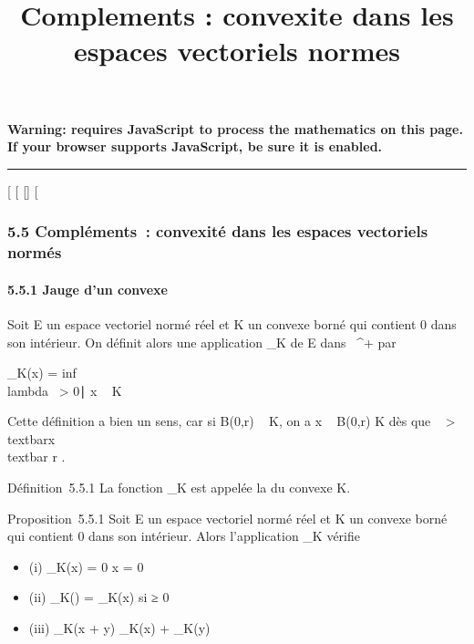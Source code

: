 \documentclass[]{article}
\title{Complements : convexite dans les espaces vectoriels normes}
\author{}
\date{}
\begin{document}
\maketitle

\textbf{Warning: 
requires JavaScript to process the mathematics on this page.\\ If your
browser supports JavaScript, be sure it is enabled.}

\begin{center}\rule{3in}{0.4pt}\end{center}

{[}
{[}
{[}{]}
{[}

\subsubsection{5.5 Compléments~: convexité dans les espaces vectoriels
normés}

\paragraph{5.5.1 Jauge d'un convexe}

Soit E un espace vectoriel normé réel et K un convexe borné qui contient
0 dans son intérieur. On définit alors une application \jmath\_K de E
dans ~^+ par

\jmath\_K(x) = inf~ \\lambda~
\textgreater{} 0∣ x \over
\lambda~ \in K\

Cette définition a bien un sens, car si B(0,r) \subset~ K, on a  x
\over \lambda~ \in B(0,r) \in K dès que \lambda~ \textgreater{}
\\textbar{}x\\textbar{}
\over r .

Définition~5.5.1 La fonction \jmath\_K est appelée la \jmathauge du
convexe K.

Proposition~5.5.1 Soit E un espace vectoriel normé réel et K un convexe
borné qui contient 0 dans son intérieur. Alors l'application
\jmath\_K vérifie

\begin{itemize}
\itemsep1pt\parskip0pt
\item
  (i) \jmath\_K(x) = 0 \Leftrightarrow x = 0
\item
  (ii) \jmath\_K(\mux) = \mu\jmath\_K(x) si \mu ≥ 0
\item
  (iii) \jmath\_K(x + y) \leq \jmath\_K(x) + \jmath\_K(y)
\end{itemize}
\end{document}
